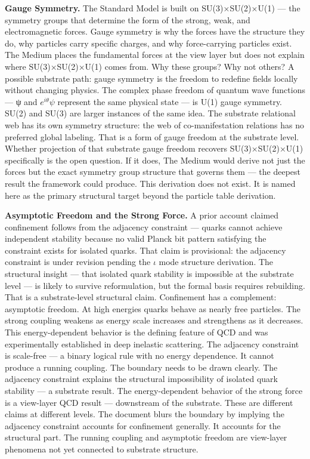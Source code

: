 \documentclass[11pt,letterpaper]{article}
\begin{document}
\textbf{Gauge Symmetry.} The Standard Model is built on SU(3)×SU(2)×U(1) --- the symmetry groups that determine the form of the strong, weak, and electromagnetic forces. Gauge symmetry is why the forces have the structure they do, why particles carry specific charges, and why force-carrying particles exist. The Medium places the fundamental forces at the view layer but does not explain where SU(3)×SU(2)×U(1) comes from. Why these groups? Why not others? A possible substrate path: gauge symmetry is the freedom to redefine fields locally without changing physics. The complex phase freedom of quantum wave functions --- ψ and \(e^{i\theta}\psi\) represent the same physical state --- is U(1) gauge symmetry. SU(2) and SU(3) are larger instances of the same idea. The substrate relational web has its own symmetry structure: the web of co-manifestation relations has no preferred global labeling. That is a form of gauge freedom at the substrate level. Whether projection of that substrate gauge freedom recovers SU(3)×SU(2)×U(1) specifically is the open question. If it does, The Medium would derive not just the forces but the exact symmetry group structure that governs them --- the deepest result the framework could produce. This derivation does not exist. It is named here as the primary structural target beyond the particle table derivation.

\textbf{Asymptotic Freedom and the Strong Force.} A prior account claimed confinement follows from the adjacency constraint --- quarks cannot achieve independent stability because no valid Planck bit pattern satisfying the constraint exists for isolated quarks. That claim is provisional: the adjacency constraint is under revision pending the \(\iota\) mode structure derivation. The structural insight --- that isolated quark stability is impossible at the substrate level --- is likely to survive reformulation, but the formal basis requires rebuilding. That is a substrate-level structural claim. Confinement has a complement: asymptotic freedom. At high energies quarks behave as nearly free particles. The strong coupling weakens as energy scale increases and strengthens as it decreases. This energy-dependent behavior is the defining feature of QCD and was experimentally established in deep inelastic scattering. The adjacency constraint is scale-free --- a binary logical rule with no energy dependence. It cannot produce a running coupling. The boundary needs to be drawn clearly. The adjacency constraint explains the structural impossibility of isolated quark stability --- a substrate result. The energy-dependent behavior of the strong force is a view-layer QCD result --- downstream of the substrate. These are different claims at different levels. The document blurs the boundary by implying the adjacency constraint accounts for confinement generally. It accounts for the structural part. The running coupling and asymptotic freedom are view-layer phenomena not yet connected to substrate structure.
\end{document}
